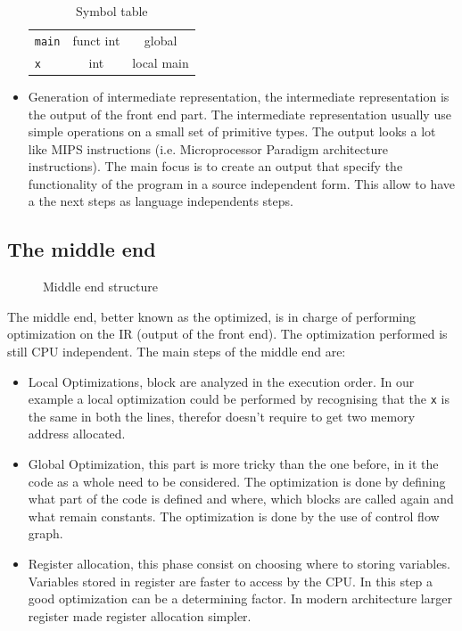 \documentclass[../main.tex]{subfiles}
\begin{document}
\begin{itemize}
\begin{table}[ht]
\begin{tabular}[t]{lcc}
        \hline
        \texttt{main}&funct int&global\\
        \texttt{x}&int &local main\\
        \hline
        \end{tabular}
        \caption{Symbol table}
        \end{table}%
    \item Generation of intermediate representation, the intermediate representation is the output of the front end part. The intermediate representation usually use simple operations on a small set of primitive types. The output looks a lot like MIPS instructions (i.e. Microprocessor Paradigm architecture instructions). The main focus is to create an output that specify the functionality of the program in a source independent form. This allow to have a the next steps as language independents steps. 
\end{itemize}
\subsection{The middle end}
\begin{figure}[h]
  \centering
{}
  \caption{Middle end structure}
\end{figure}
The middle end, better known as the optimized, is in charge of performing optimization on the IR (output of the front end). The optimization performed is still CPU independent. The main steps of the middle end are:
\begin{itemize}
    \item Local Optimizations, block are analyzed in the execution order. In our example a local optimization could be performed by recognising that the \texttt{x} is the same in both the lines, therefor doesn't require to get two memory address allocated. 
    \item Global Optimization, this part is more tricky than the one before, in it the code as a whole need to be considered. The optimization is done by defining what part of the code is defined and where, which blocks are called again and what remain constants. The optimization is done by the use of control flow graph. 
    \item Register allocation, this phase consist on choosing where to storing variables. Variables stored in register are faster to access by the CPU. In this step a good optimization can be a determining factor. In modern architecture larger register made register allocation simpler. 
\end{itemize}
\end{document}
